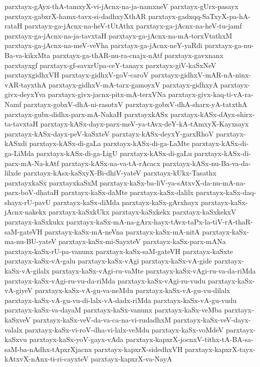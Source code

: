 {parxtayx-gAyx-thA-tamxyX-vi-jAcnx-na-ja-namxneV
parxtayx-gUrx-pasayx
parxtayx-gabxrX-hamx-tavx-si-dadhxyXthAR
parxtayx-gadxqq-SaTxyX-pa-hA-rataH
parxtayx-ga-jAcnx-na-heV-tUtAthx
parxtayx-ga-jAcnx-na-heV-tu-jamf
parxtayx-ga-jAcnx-na-ja-tavxtaH
parxtayx-ga-jAcnx-na-mA-torxVtathxM
parxtayx-ga-jAcnx-na-meV-veVha
parxtayx-ga-jAcnx-neY-yaRdi
parxtayx-ga-nu-Ba-va-kikxMta
parxtayx-ga-thAR-nu-ra-cnajx-nAtf
parxtayx-gavxnanx
parxtayxgf
parxtayx-gf-savxrUpa-ceY-tanayx
parxtayx-giV-kaSxNeV
parxtayxgidhxVH
parxtayx-gidhxV-goV-caroV
parxtayx-gidhxV-mAR-nA-ninx-vAR-tayxthA
parxtayx-gidhxV-mA-tarx-gamoyxV
parxtayx-gidhxyA
parxtayx-givx-deyxYva
parxtayx-givx-jacnx-pitx-mA-terxVNa
parxtayx-givx-kaq-ti-vA-ra-Namf
parxtayx-gobxV-dhA-ni-rasotxV
parxtayx-gobxV-dhA-sharx-yA-tatxthA
parxtayx-gubx-didhx-parx-mA-NakaH
parxtayxkASx
parxtayx-kASx-dAyx-shirx-ta-tavxtaH
parxtayx-kASx-dayx-parx-meV-ya-tAvx-deY-kA-tAmxyX-Kayxsayx
parxtayx-kASx-dayx-peV-kaSxteV
parxtayx-kASx-deyxY-garxRhoV
parxtayx-kASxdi
parxtayx-kASx-di-gaLa
parxtayx-kASx-di-ga-LaMte
parxtayx-kASx-di-ga-LiMda
parxtayx-kASx-di-ga-LigU
parxtayx-kASx-di-gaLu
parxtayx-kASx-di-parx-mA-Na-kAtf
parxtayx-kASx-na-va-tA-rAcacx
parxtayx-kASx-nu-Ba-va-da-lilxde
parxtayx-kAsx-kaSxyX-Bi-dhiV-yateV
parxtayx-kUkx-Tasathx
parxtayxkaSx
parxtayxkaSxM
parxtayx-kaSx-ba-liV-ya-sAtxvX-da-nu-mA-na-parx-boV-dhataH
parxtayx-kaSx-daMte
parxtayx-kaSx-dalilx
parxtayx-kaSx-daq-shayx-rU-pavU
parxtayx-kaSx-diMda
parxtayx-kaSx-gArxhayx
parxtayx-kaSx-jAcnx-nakekx
parxtayx-kaSxkUkx
parxtayx-kaSxkekx
parxtayx-kaSxkekxV
parxtayx-kaSxkukx
parxtayx-kaSx-mA-na-gArx-hayx-tAvx-taPx-la-tiV-rA-thaR-saM-gateVH
parxtayx-kaSx-mA-neVna
parxtayx-kaSx-mA-nitA
parxtayx-kaSx-ma-nu-BU-yateV
parxtayx-kaSx-mi-SayxteV
parxtayx-kaSx-parx-mANa
parxtayx-kaSx-rU-pa-vanunx
parxtayx-kaSx-saM-gateVH
parxtayx-kaSxte
parxtayx-kaSx-vA-galu
parxtayx-kaSx-vAgi
parxtayx-kaSx-vA-gide
parxtayx-kaSx-vA-gilalx
parxtayx-kaSx-vAgi-ru-vaMte
parxtayx-kaSx-vAgi-ru-va-da-riMda
parxtayx-kaSx-vAgi-ru-vu-da-riMda
parxtayx-kaSx-vAgi-ru-vudu
parxtayx-kaSx-vA-giyeV
parxtayx-kaSx-vA-gu-va-neMdu
parxtayx-kaSx-vA-gu-vu-dilalx
parxtayx-kaSx-vA-gu-vu-di-lalx-vA-dadx-riMda
parxtayx-kaSx-vA-gu-vudu
parxtayx-kaSx-va-dayaM
parxtayx-kaSx-vanunx
parxtayx-kaSx-veMba
parxtayx-kaSxveV
parxtayx-kaSx-veV-da-va-ca-na-vi-rudadhxM
parxtayx-kaSx-veV-dayx-valalx
parxtayx-kaSx-vi-roV-dha-vi-lalx-veMdu
parxtayx-kaSx-voMdeV
parxtayx-kaSxvu
parxtayx-kaSx-yoV-gayx-vAda
parxtayx-kapxrX-jocnxV-tithx-tA-BA-sa-saM-ba-nAdhx-tApxrXjacnx
parxtayx-kapxrX-sidedhxVH
parxtayx-kapxrX-tayx-kAtxvX-nAnx-ti-ri-cayxteV
parxtayx-kapxrX-va-NayA
}
